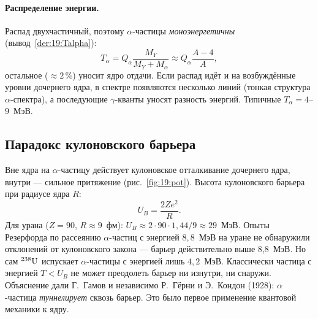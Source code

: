 \paragraph{Распределение энергии.} Распад двухчастичный, поэтому $\alpha$-частицы \emph{моноэнергетичны} (вывод~\ref{der:19:Talpha}):
\begin{equation}\label{eq:19:Ta}
  T_\alpha=Q_\alpha\frac{M_Y}{M_Y+M_\alpha}\approx Q_\alpha\frac{A-4}{A},
\end{equation}
остальное ($\approx2\,\%$) уносит ядро отдачи. Если распад идёт и на возбуждённые уровни дочернего ядра, в спектре появляются
несколько линий (тонкая структура $\alpha$-спектра), а последующие $\gamma$-кванты уносят разность энергий. Типичные $T_\alpha=4$--$9$~МэВ.

\subsection{Парадокс кулоновского барьера}

Вне ядра на $\alpha$-частицу действует кулоновское отталкивание дочернего ядра, внутри — сильное притяжение
(рис.~\ref{fig:19:pot}). Высота кулоновского барьера при радиусе ядра $R$:
\begin{equation}\label{eq:19:barrier}
  U_B=\frac{2Ze^2}{R}.
\end{equation}
Для урана ($Z=90$, $R\approx9$~фм): $U_B\approx2\cdot90\cdot1{,}44/9\approx29$~МэВ. Опыты Резерфорда по рассеянию $\alpha$-частиц с энергией
$8{,}8$~МэВ на уране не обнаружили отклонений от кулоновского закона — барьер действительно выше 8,8~МэВ. Но сам $\nucl{U}{238}$
испускает $\alpha$-частицы с энергией лишь $4{,}2$~МэВ. Классически частица с энергией $T<U_B$ не может преодолеть барьер ни
изнутри, ни снаружи. Объяснение дали Г.~Гамов и независимо Р.~Гёрни и Э.~Кондон (1928): $\alpha$-частица \emph{туннелирует}
сквозь барьер. Это было первое применение квантовой механики к ядру.

